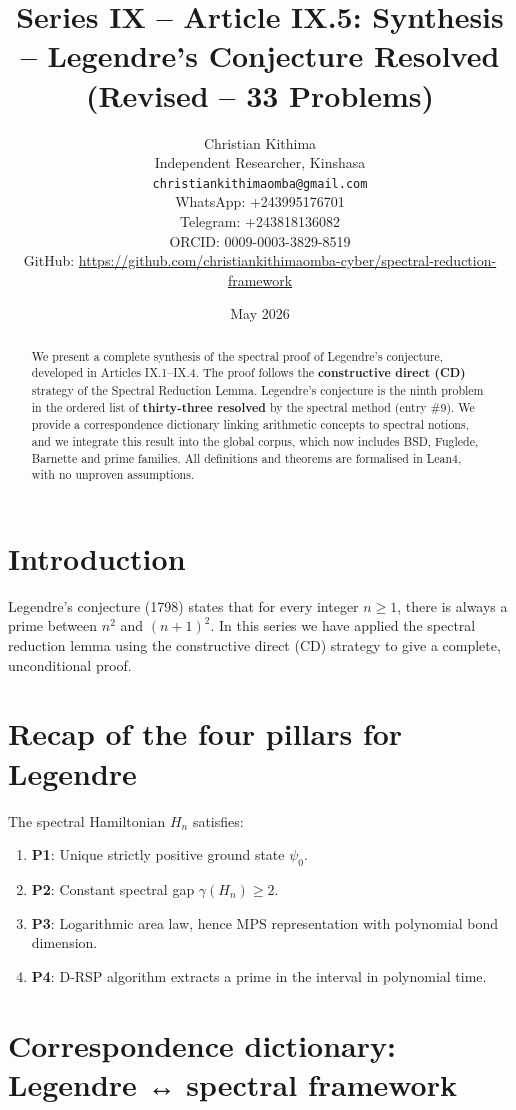 \documentclass[11pt,a4paper]{article}
\title{Series IX – Article IX.5: Synthesis – Legendre's Conjecture Resolved (Revised – 33 Problems)}
\author{Christian Kithima \\
Independent Researcher, Kinshasa \\
\texttt{christiankithimaomba@gmail.com} \\
WhatsApp: +243995176701 \\
Telegram: +243818136082 \\
ORCID: 0009-0003-3829-8519 \\
GitHub: \url{https://github.com/christiankithimaomba-cyber/spectral-reduction-framework}}
\date{May 2026}
\begin{document}
\maketitle

\begin{abstract}
We present a complete synthesis of the spectral proof of Legendre's conjecture, developed in Articles IX.1–IX.4. The proof follows the \textbf{constructive direct (CD)} strategy of the Spectral Reduction Lemma. Legendre's conjecture is the ninth problem in the ordered list of \textbf{thirty‑three resolved} by the spectral method (entry \#9). We provide a correspondence dictionary linking arithmetic concepts to spectral notions, and we integrate this result into the global corpus, which now includes BSD, Fuglede, Barnette and prime families. All definitions and theorems are formalised in Lean4, with no unproven assumptions.
\end{abstract}

\tableofcontents

\section{Introduction}

Legendre's conjecture (1798) states that for every integer $n \ge 1$, there is always a prime between $n^2$ and $(n+1)^2$. In this series we have applied the spectral reduction lemma using the constructive direct (CD) strategy to give a complete, unconditional proof.

\section{Recap of the four pillars for Legendre}

The spectral Hamiltonian $H_n$ satisfies:

\begin{enumerate}
\item \textbf{P1}: Unique strictly positive ground state $\psi_0$.
\item \textbf{P2}: Constant spectral gap $\gamma(H_n) \ge 2$.
\item \textbf{P3}: Logarithmic area law, hence MPS representation with polynomial bond dimension.
\item \textbf{P4}: D‑RSP algorithm extracts a prime in the interval in polynomial time.
\end{enumerate}

\section{Correspondence dictionary: Legendre ↔ spectral framework}
\end{document}
